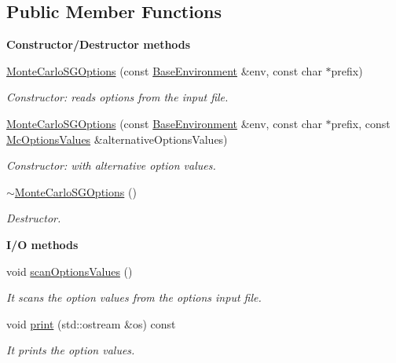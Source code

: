 \subsection*{Public Member Functions}
\begin{Indent}{\bf Constructor/\-Destructor methods}\par
\begin{DoxyCompactItemize}
\item 
\hyperlink{class_q_u_e_s_o_1_1_monte_carlo_s_g_options_a8d22c4c64bdd7ea6abe20cfce4e23886}{Monte\-Carlo\-S\-G\-Options} (const \hyperlink{class_q_u_e_s_o_1_1_base_environment}{Base\-Environment} \&env, const char $\ast$prefix)
\begin{DoxyCompactList}\small\item\em Constructor\-: reads options from the input file. \end{DoxyCompactList}\item 
\hyperlink{class_q_u_e_s_o_1_1_monte_carlo_s_g_options_acdf23f683c4aaf634a019f5a7428e3cf}{Monte\-Carlo\-S\-G\-Options} (const \hyperlink{class_q_u_e_s_o_1_1_base_environment}{Base\-Environment} \&env, const char $\ast$prefix, const \hyperlink{class_q_u_e_s_o_1_1_mc_options_values}{Mc\-Options\-Values} \&alternative\-Options\-Values)
\begin{DoxyCompactList}\small\item\em Constructor\-: with alternative option values. \end{DoxyCompactList}\item 
\hyperlink{class_q_u_e_s_o_1_1_monte_carlo_s_g_options_a4741d71a4c085ecb209513995ece3a90}{$\sim$\-Monte\-Carlo\-S\-G\-Options} ()
\begin{DoxyCompactList}\small\item\em Destructor. \end{DoxyCompactList}\end{DoxyCompactItemize}
\end{Indent}
\begin{Indent}{\bf I/\-O methods}\par
\begin{DoxyCompactItemize}
\item 
void \hyperlink{class_q_u_e_s_o_1_1_monte_carlo_s_g_options_a161ddeaf12cc851a16ff4d9ca77e1769}{scan\-Options\-Values} ()
\begin{DoxyCompactList}\small\item\em It scans the option values from the options input file. \end{DoxyCompactList}\item 
void \hyperlink{class_q_u_e_s_o_1_1_monte_carlo_s_g_options_a4c28feb1596bc5136460b7086f914973}{print} (std\-::ostream \&os) const 
\begin{DoxyCompactList}\small\item\em It prints the option values. \end{DoxyCompactList}\end{DoxyCompactItemize}
\end{Indent}
